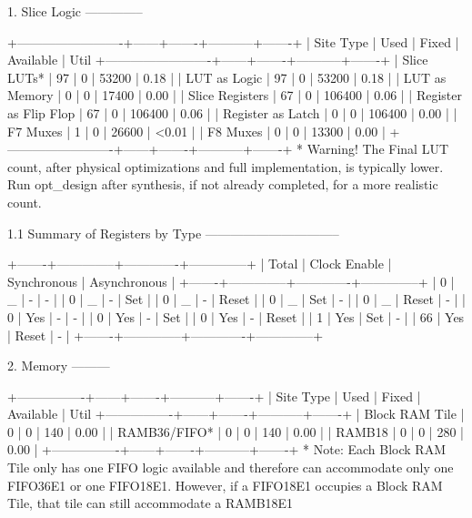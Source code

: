 \documentclass{article}
\begin{document}
1. Slice Logic
--------------

+-------------------------+------+-------+-----------+-------+
|        Site Type        | Used | Fixed | Available | Util%
+-------------------------+------+-------+-----------+-------+
| Slice LUTs*             |   97 |     0 |     53200 |  0.18 |
|   LUT as Logic          |   97 |     0 |     53200 |  0.18 |
|   LUT as Memory         |    0 |     0 |     17400 |  0.00 |
| Slice Registers         |   67 |     0 |    106400 |  0.06 |
|   Register as Flip Flop |   67 |     0 |    106400 |  0.06 |
|   Register as Latch     |    0 |     0 |    106400 |  0.00 |
| F7 Muxes                |    1 |     0 |     26600 | <0.01 |
| F8 Muxes                |    0 |     0 |     13300 |  0.00 |
+-------------------------+------+-------+-----------+-------+
* Warning! The Final LUT count, after physical optimizations and full implementation, is typically lower. Run opt_design after synthesis, if not already completed, for a more realistic count.


1.1 Summary of Registers by Type
--------------------------------

+-------+--------------+-------------+--------------+
| Total | Clock Enable | Synchronous | Asynchronous |
+-------+--------------+-------------+--------------+
| 0     |            _ |           - |            - |
| 0     |            _ |           - |          Set |
| 0     |            _ |           - |        Reset |
| 0     |            _ |         Set |            - |
| 0     |            _ |       Reset |            - |
| 0     |          Yes |           - |            - |
| 0     |          Yes |           - |          Set |
| 0     |          Yes |           - |        Reset |
| 1     |          Yes |         Set |            - |
| 66    |          Yes |       Reset |            - |
+-------+--------------+-------------+--------------+


2. Memory
---------

+----------------+------+-------+-----------+-------+
|    Site Type   | Used | Fixed | Available | Util%
+----------------+------+-------+-----------+-------+
| Block RAM Tile |    0 |     0 |       140 |  0.00 |
|   RAMB36/FIFO* |    0 |     0 |       140 |  0.00 |
|   RAMB18       |    0 |     0 |       280 |  0.00 |
+----------------+------+-------+-----------+-------+
* Note: Each Block RAM Tile only has one FIFO logic available and therefore can accommodate only one FIFO36E1 or one FIFO18E1. However, if a FIFO18E1 occupies a Block RAM Tile, that tile can still accommodate a RAMB18E1
\end{document}
